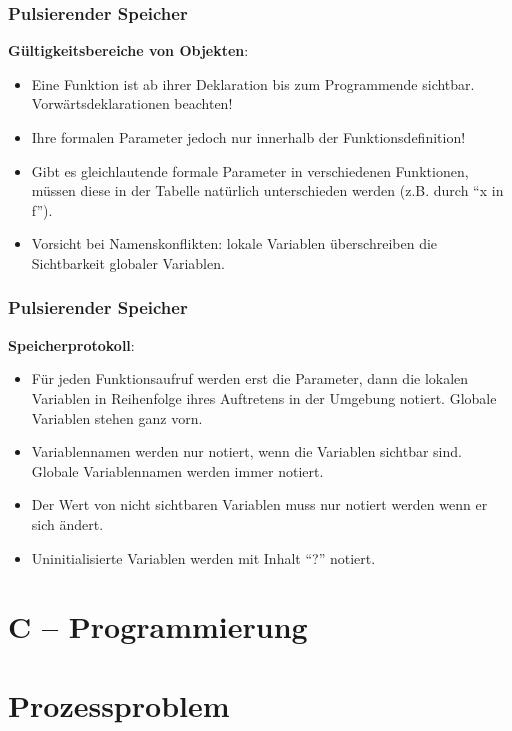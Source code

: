 \documentclass{beamer}
\begin{document}
\begin{frame} \frametitle{Pulsierender Speicher}
	\small
	\textbf{Gültigkeitsbereiche von Objekten}:
	\begin{itemize}
		\item Eine Funktion ist ab ihrer Deklaration bis zum Programmende sichtbar. Vorwärtsdeklarationen beachten!
		\item  Ihre formalen Parameter jedoch nur innerhalb der Funktionsdefinition!
		\item Gibt es gleichlautende formale Parameter in verschiedenen Funktionen, müssen diese in der Tabelle natürlich unterschieden werden (z.B. durch \enquote{x in f}).
		\item Vorsicht bei Namenskonflikten: lokale Variablen überschreiben die Sichtbarkeit globaler Variablen.
	\end{itemize}
\end{frame}

\begin{frame} \frametitle{Pulsierender Speicher}
	\small
	\textbf{Speicherprotokoll}:
	\begin{itemize}
		\item Für jeden Funktionsaufruf werden erst die Parameter, dann die lokalen Variablen in Reihenfolge ihres Auftretens in der Umgebung notiert. Globale Variablen stehen ganz vorn.
		\item Variablennamen werden nur notiert, wenn die Variablen sichtbar sind. Globale Variablennamen werden immer notiert.
		\item Der Wert von nicht sichtbaren Variablen muss nur notiert werden wenn er sich ändert.
		\item Uninitialisierte Variablen werden mit Inhalt \enquote{?} notiert.
	\end{itemize}
\end{frame}

\section{C -- Programmierung}

\section{Prozessproblem}
\end{document}
